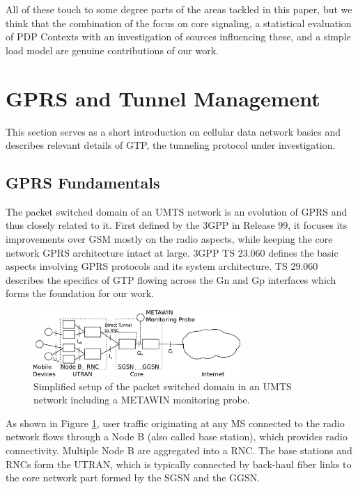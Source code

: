 All of these touch to some degree parts of the areas tackled in this paper, but we think that the combination of the focus on core signaling, a statistical evaluation of PDP Contexts with an investigation of sources influencing these, and a simple load model are genuine contributions of our work.


\section{GPRS and Tunnel Management}
\label{sec:gtp-IMC}
\acresetall

This section serves as a short introduction on cellular data network basics and describes relevant details of \ac{GTP}, the tunneling protocol under investigation.


\subsection{\acs{GPRS} Fundamentals}

The packet switched domain of an \ac{UMTS} network is an evolution of \ac{GPRS} and thus closely related to it. First defined by the \ac{3GPP} in Release 99, it focuses its improvements over \ac{GSM} mostly on the radio aspects, while keeping the core network \ac{GPRS} architecture intact at large. \ac{3GPP} \ac{TS} 23.060 \cite{3gpp23060} defines the basic aspects involving \ac{GPRS} protocols and its system architecture. \ac{TS} 29.060 \cite{3gpp29060} describes the specifics of \ac{GTP} flowing across the Gn and Gp interfaces which forms the foundation for our work.

\begin{figure}
	\centering
	\includegraphics[width=0.7\textwidth]{images/IMC2013/umts-network.pdf}
	\caption{Simplified setup of the packet switched domain in an \acs{UMTS} network including a METAWIN monitoring probe.}
	\label{fig:umtsnetwork}
\end{figure}

As shown in Figure \ref{fig:umtsnetwork}, user traffic originating at any \ac{MS} connected to the radio network flows through a Node B (also called base station), which provides radio connectivity. Multiple Node B are aggregated into a \ac{RNC}. The base stations and \acp{RNC} form the \ac{UTRAN}, which is typically connected by back-haul fiber links to the core network part formed by the \ac{SGSN} and the \ac{GGSN}.

